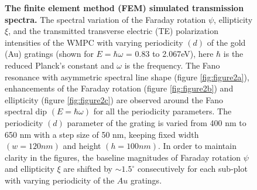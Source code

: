 \documentclass[13pt]{article}
\begin{document}
\begin{figure}[hbt!]
\begin{subfigure}[]{.49\linewidth}
		\caption{}
		\label{fig:figure2d}
	\end{subfigure}
	\caption{\textbf{The finite element method (FEM) simulated transmission spectra.} The spectral variation of the Faraday rotation $\psi$, ellipticity $\xi$, and the transmitted transverse electric (TE) polarization intensities of the WMPC with varying periodicity $(d)$ of the gold (Au) gratings (shown for $E=\hbar \omega$ = 0.83 to 2.067eV), here $\hbar$ is the reduced Planck’s constant and $\omega$ is the frequency. The Fano resonance with asymmetric spectral line shape (figure \ref{fig:figure2a}), enhancements of the Faraday rotation  (figure \ref{fig:figure2b}) and ellipticity (figure \ref{fig:figure2c}) are observed around the Fano spectral dip $(E=\hbar \omega)$ for all the periodicity parameters. The periodicity $(d)$ parameter of the grating is varied from 400 nm to 650 nm with a step size of 50 nm, keeping fixed width $(w = 120 nm)$ and height $(h = 100 nm)$. In order to maintain clarity in the figures, the baseline magnitudes of Faraday rotation $\psi$ and ellipticity $\xi$ are shifted by $ \sim 1.5^{\circ}$ consecutively for each sub-plot with varying periodicity of the $Au$ gratings.}
	\label{fig:figure2}
\end{figure}
\end{document}
